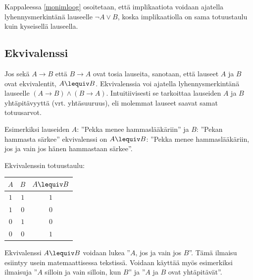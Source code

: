 \bigskip

Kappaleessa \ref{monimloog} osoitetaan, että implikaatiota voidaan ajatella lyhennysmerkintänä lauseelle $\lnot A \lor B$, koska implikaatiolla on sama totuustaulu kuin kyseisellä lauseella.


\subsection*{Ekvivalenssi}
Jos sekä $A\to B$ että $B\to A$ ovat tosia lauseita, sanotaan, että lauseet $A$ ja $B$ ovat ekvivalentit, $A \lequiv B$. Ekvivalenssia voi ajatella lyhennysmerkintänä lauseelle $(A\to B) \land (B\to A)$. Intuitiivisesti se tarkoittaa lauseiden $A$ ja $B$ yhtäpitävyyttä (vrt. yhtäsuuruus), eli molemmat lauseet saavat samat totuusarvot.


Esimerkiksi lauseiden $A$: ''Pekka menee hammaslääkäriin'' ja $B$: ''Pekan hammasta särkee'' ekvivalenssi on $A \lequiv B$: ''Pekka menee hammaslääkäriin, jos ja vain jos hänen hammastaan särkee''.

Ekvivalenssin totuustaulu:

\bigskip

\begin{center}
\begin{tabular}{|c|c|c|}\hline
$A$ & $B$ & $A \lequiv  B$ \\ \hline
$1$ & $1$ & $1$\\ %
$1$ & $0$ & $0$\\
$0$ & $1$ & $0$\\
$0$ & $0$ & $1$\\ \hline
\end{tabular}
\end{center}

\bigskip

Ekvivalenssi $A\lequiv B$ voidaan lukea ''$A$, jos ja vain jos $B$''. Tämä ilmaisu esiintyy usein matemaattisessa tekstissä. Voidaan käyttää myös esimerkiksi ilmaisuja ''$A$ silloin ja vain silloin, kun $B$'' ja ''$A$ ja $B$ ovat yhtäpitävät''.



